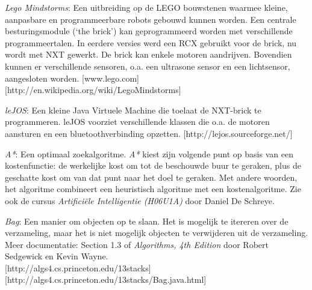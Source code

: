 \documentclass[tt3]{penoverslag}
\begin{document}
\begin{thebibliography}{9}

\textit{Lego Mindstorms}:  Een uitbreiding op de LEGO bouwstenen waarmee kleine, aanpasbare en programmeerbare robots gebouwd kunnen worden. Een centrale besturingsmodule (`the brick') kan geprogrammeerd worden met verschillende programmeertalen. In eerdere versies werd een RCX gebruikt voor de brick, nu wordt met NXT gewerkt. De brick kan enkele motoren aandrijven. Bovendien kunnen er verschillende sensoren, o.a. een ultrasone sensor en een lichtsensor, aangesloten worden.  \mbox{[www.lego.com]} \mbox{[http://en.wikipedia.org/wiki/Lego\textendash Mindstorms]}

\textit{leJOS}: Een kleine Java Virtuele Machine die toelaat de NXT-brick te programmeren. leJOS voorziet verschillende klassen die o.a. de motoren aansturen en een bluetoothverbinding opzetten.  \mbox{[http://lejos.sourceforge.net/]}

\textit{A*}: Een optimaal zoekalgoritme. \textit{A*} kiest zijn volgende punt op basis van een kostenfunctie: de werkelijke kost om tot de beschouwde buur te geraken, plus de geschatte kost om van dat punt naar het doel te geraken. Met andere woorden, het algoritme combineert een heuristisch algoritme met een kostenalgoritme. Zie ook de cursus \textit{Artifici\"ele Intelligentie (H06U1A)} door Daniel De Schreye.

\textit{Bag}: Een manier om objecten op te slaan. Het is mogelijk te itereren over de verzameling, maar het is niet mogelijk objecten te verwijderen uit de verzameling. Meer documentatie: Section 1.3 of \textit{Algorithms, 4th Edition} door Robert Sedgewick en Kevin Wayne.\\
\mbox{[http://algs4.cs.princeton.edu/13stacks]} \mbox{[http://algs4.cs.princeton.edu/13stacks/Bag.java.html]}
\end{thebibliography}
\end{document}
